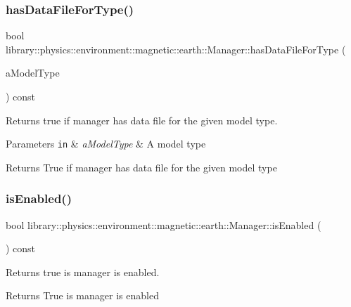 \subsubsection{\texorpdfstring{has\+Data\+File\+For\+Type()}{hasDataFileForType()}}
{\footnotesize\ttfamily bool library\+::physics\+::environment\+::magnetic\+::earth\+::\+Manager\+::has\+Data\+File\+For\+Type (\begin{DoxyParamCaption}\item[{const \hyperlink{classlibrary_1_1physics_1_1environment_1_1magnetic_1_1_earth_ab9d257d23aa5899a3ef36c7dec62ef72}{Earth\+Magnetic\+Model\+::\+Type} \&}]{a\+Model\+Type }\end{DoxyParamCaption}) const}



Returns true if manager has data file for the given model type. 


\begin{DoxyParams}[1]{Parameters}
\mbox{\tt in}  & {\em a\+Model\+Type} & A model type \\
\hline
\end{DoxyParams}
\begin{DoxyReturn}{Returns}
True if manager has data file for the given model type 
\end{DoxyReturn}
\mbox{\label{classlibrary_1_1physics_1_1environment_1_1magnetic_1_1earth_1_1_manager_a0b238ac6a27372ef08a87eb72fae0ba0}} 
\subsubsection{\texorpdfstring{is\+Enabled()}{isEnabled()}}
{\footnotesize\ttfamily bool library\+::physics\+::environment\+::magnetic\+::earth\+::\+Manager\+::is\+Enabled (\begin{DoxyParamCaption}{ }\end{DoxyParamCaption}) const}



Returns true is manager is enabled. 

\begin{DoxyReturn}{Returns}
True is manager is enabled 
\end{DoxyReturn}
\mbox{\label{classlibrary_1_1physics_1_1environment_1_1magnetic_1_1earth_1_1_manager_a1f9e25590f17e9a58d8b4948f290e255}} 
